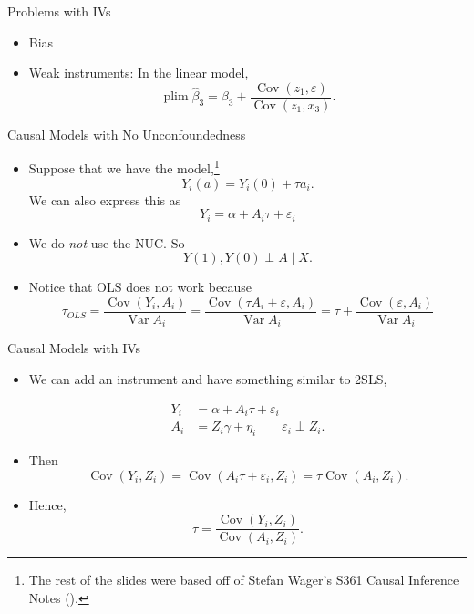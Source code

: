 \documentclass[handout]{beamer} %
\DeclareMathOperator*{\Cov}{Cov}
\DeclareMathOperator*{\Var}{Var}
\DeclareMathOperator*{\plim}{plim}
\begin{document}
\begin{frame}{Problems with IVs}

  \begin{itemize}
    \item<2-> Bias
    \item<3-> Weak instruments: In the linear model,
      \[\plim \hat \beta_3 = \beta_3 + \frac{\Cov(z_1, \varepsilon)}{\Cov(z_1,
      x_3)}.\]
  \end{itemize}
  
\end{frame}

\begin{frame}{Causal Models with No Unconfoundedness}

  \begin{itemize}
    \item Suppose that we have the model,\footnote{The rest of the slides were
      based off of Stefan Wager's S361 Causal Inference Notes
      (\cite{wager2020stats}).}
      \[Y_i(a) = Y_i(0) + \tau a_i.\]
      We can also express this as 
      \[Y_i = \alpha + A_i \tau + \varepsilon_i\]
    \item We do \textit{not} use the NUC. So 
      \[Y(1), Y(0) \perp A \mid X.\]
    \item Notice that OLS does not work because
      \[\tau_{OLS} = \frac{\Cov(Y_i, A_i)}{\Var{A_i}} = 
      \frac{\Cov(\tau A_i + \varepsilon, A_i)}{\Var{A_i}} =
      \tau + 
      \frac{\Cov(\varepsilon, A_i)}{\Var{A_i}}\]
  \end{itemize}
  
\end{frame}

\begin{frame}{Causal Models with IVs}

  \begin{itemize}
    \item<1-> We can add an instrument and have something similar to 2SLS,

      \begin{align*}
        Y_i &= \alpha + A_i \tau + \varepsilon_i \\
        A_i &= Z_i \gamma + \eta_i \qquad \varepsilon_i \perp Z_i.
      \end{align*}
    \item<2-> Then
      \[\Cov(Y_i, Z_i) = \Cov(A_i \tau + \varepsilon_i, Z_i) = \tau \Cov(A_i,
      Z_i).\]
    \item<3-> Hence,
      \[\tau = \frac{\Cov{(Y_i, Z_i)}}{\Cov(A_i, Z_i)}.\]
  \end{itemize}
  
\end{frame}
\end{document}
